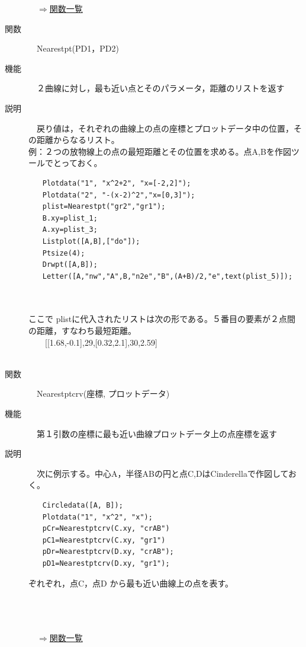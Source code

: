 \documentclass[papersize,a4paper,12pt,uplatex]{jsarticle}
\begin{document}
\begin{description}
\begin{flushright}　\hyperlink{functionlist}{$\Rightarrow$関数一覧}\end{flushright}

\hypertarget{nearestpt}{}
\item[関数]　Nearestpt(PD1，PD2)
\item[機能]　２曲線に対し，最も近い点とそのパラメータ，距離のリストを返す
\item[説明]　戻り値は，それぞれの曲線上の点の座標とプロットデータ中の位置，その距離からなるリスト。\\
例：２つの放物線上の点の最短距離とその位置を求める。点A,Bを作図ツールでとっておく。
\begin{verbatim}
　　Plotdata("1", "x^2+2", "x=[-2,2]");
　　Plotdata("2", "-(x-2)^2","x=[0,3]");
　　plist=Nearestpt("gr2","gr1");
　　B.xy=plist_1;
　　A.xy=plist_3;
　　Listplot([A,B],["do"]);
　　Ptsize(4);
　　Drwpt([A,B]);
　　Letter([A,"nw","A",B,"n2e","B",(A+B)/2,"e",text(plist_5)]);
\end{verbatim}
　　　　　　\\
\\
ここで plistに代入されたリストは次の形である。５番目の要素が２点間の距離，すなわち最短距離。\\
　　[[1.68,-0.1],29,[0.32,2.1],30,2.59] \\
　\\
\hypertarget{nearestptcrv}{}
\item[関数]　Nearestptcrv(座標, プロットデータ)
\item[機能]　第１引数の座標に最も近い曲線プロットデータ上の点座標を返す
\item[説明]　次に例示する。中心A，半径ABの円と点C,DはCinderellaで作図しておく。
\begin{verbatim}
　　Circledata([A, B]);
　　Plotdata("1", "x^2", "x");
　　pCr=Nearestptcrv(C.xy, "crAB")
　　pC1=Nearestptcrv(C.xy, "gr1")
　　pDr=Nearestptcrv(D.xy, "crAB");
　　pD1=Nearestptcrv(D.xy, "gr1");
\end{verbatim}
ぞれぞれ，点C，点D から最も近い曲線上の点を表す。\\
　\\
　　　　　　\\

　\\
\begin{flushright}　\hyperlink{functionlist}{$\Rightarrow$関数一覧}\end{flushright}


\end{description}
\end{document}

